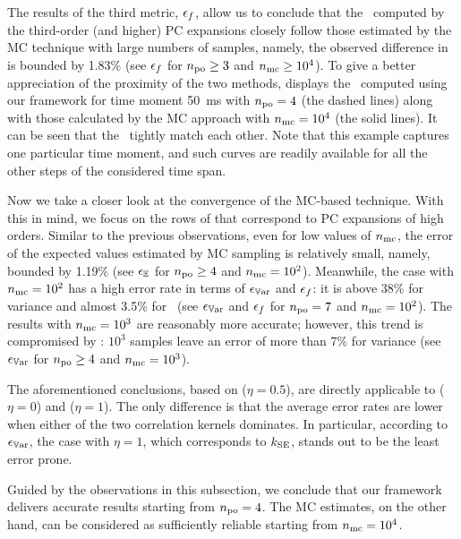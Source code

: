 The results of the third metric, $\epsilon_f$, allow us to conclude that the \pdfs\ computed by the third-order (and higher) PC expansions closely follow those estimated by the MC technique with large numbers of samples, namely, the observed difference in  is bounded by 1.83\% (see $\epsilon_f$ for ${n_\text{po}} \geq 3$ and ${n_\text{mc}} \geq 10^4$).
To give a better appreciation of the proximity of the two methods,  displays the \pdfs\ computed using our framework for time moment 50~ms with ${n_\text{po}} = 4$ (the dashed lines) along with those calculated by the MC approach with ${n_\text{mc}} = 10^4$ (the solid lines).
It can be seen that the \pdfs\ tightly match each other.
Note that this example captures one particular time moment, and such curves are readily available for all the other steps of the considered time span.

Now we take a closer look at the convergence of the MC-based technique.
With this in mind, we focus on the rows of  that correspond to PC expansions of high orders.
Similar to the previous observations, even for low values of ${n_\text{mc}}$, the error of the expected values estimated by MC sampling is relatively small, namely, bounded by 1.19\% (see $\epsilon_\mathbb{E}$ for ${n_\text{po}} \geq 4$ and ${n_\text{mc}} = 10^2$).
Meanwhile, the case with ${n_\text{mc}} = 10^2$ has a high error rate in terms of $\epsilon_{\mathbb{V}\text{ar}}$ and $\epsilon_f$: it is above 38\% for variance and almost 3.5\% for \pdfs\ (see $\epsilon_{\mathbb{V}\text{ar}}$ and $\epsilon_f$ for ${n_\text{po}} = 7$ and ${n_\text{mc}} = 10^2$).
The results with ${n_\text{mc}} = 10^3$ are reasonably more accurate; however, this trend is compromised by : $10^3$ samples leave an error of more than 7\% for variance (see $\epsilon_{\mathbb{V}\text{ar}}$ for ${n_\text{po}} \geq 4$ and ${n_\text{mc}} = 10^3$).

The aforementioned conclusions, based on  ($\eta = 0.5$), are directly applicable to  ($\eta = 0$) and  ($\eta = 1$).
The only difference is that the average error rates are lower when either of the two correlation kernels dominates.
In particular, according to $\epsilon_{\mathbb{V}\text{ar}}$, the case with $\eta = 1$, which corresponds to $\fCorr_\SE$, stands out to be the least error prone.

Guided by the observations in this subsection, we conclude that our framework delivers accurate results starting from ${n_\text{po}} = 4$.
The MC estimates, on the other hand, can be considered as sufficiently reliable starting from ${n_\text{mc}} = 10^4$.
